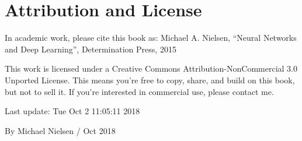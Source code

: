 \section*{Attribution and License}

In academic work, please cite this book \cite{Nielsen2015} as: Michael A. Nielsen, ``Neural Networks and Deep Learning'', Determination Press, 2015 

This work is licensed under a Creative Commons Attribution-NonCommercial 3.0 Unported License. This means you're free to copy, share, and build on this book, but not to sell it. If you're interested in commercial use, please contact me. 

Last update: Tue Oct 2 11:05:11 2018 

By Michael Nielsen / Oct 2018 

